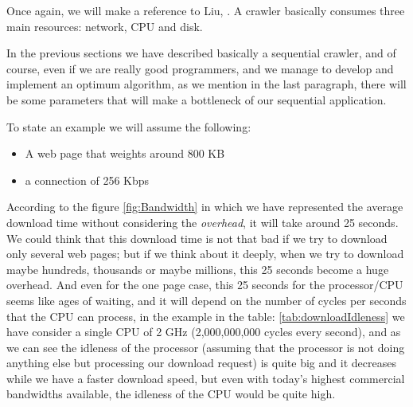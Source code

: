 Once again, we will make a reference to Liu, \cite%
{L2011}. A crawler basically consumes three main resources: network, CPU and disk. 

In the previous sections we have described basically a sequential crawler, and of course, even if we are really good programmers, and we manage to develop and implement an optimum algorithm, as we mention in the last paragraph, there will be some parameters that will make a bottleneck of our sequential application. 



To state an example we will assume the following: 
\begin{itemize}
    \item A web page that weights around 800 KB
    \item a connection of 256 Kbps
\end{itemize}

According to the figure \ref{fig:Bandwidth} in which we have represented the average download time without considering the \emph{overhead}, it will take around 25 seconds. We could think that this download time is not that bad if we try to download only several web pages; but if we think about it deeply, when we try to download maybe hundreds, thousands or maybe millions, this 25 seconds become a huge overhead. And even for the one page case, this 25 seconds for the processor/CPU seems like ages of waiting, and it will depend on the number of cycles per seconds that the CPU can process, in the example in the table: \ref{tab:downloadIdleness} we have consider a single CPU of 2 GHz (2,000,000,000 cycles every second), and as we can see the idleness of the processor (assuming that the processor is not doing anything else but processing our download request) is quite big and it decreases while we have a faster download speed, but even with today's highest commercial bandwidths available, the idleness of the CPU would be quite high.


